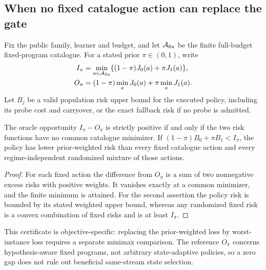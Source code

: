 \subsection{When no fixed catalogue action can replace the gate}
Fix the public family, learner and budget, and let $\mathcal A_{\rm fix}$ be the finite full-budget fixed-program catalogue.
For a stated prior $\pi\in(0,1)$, write
\begin{align}
I_\pi&=\min_{a\in\mathcal A_{\rm fix}}\{(1-\pi)J_0(a)+\pi J_1(a)\},\\
O_\pi&=(1-\pi)\min_aJ_0(a)+\pi\min_aJ_1(a).
\end{align}
Let $B_j$ be a valid population risk upper bound for the executed policy, including its probe cost and carryover, or the exact fallback risk if no probe is admitted.
\begin{proposition}
The oracle opportunity $I_\pi-O_\pi$ is strictly positive if and only if the two risk functions have no common catalogue minimizer.
If $(1-\pi)B_0+\pi B_1<I_\pi$, the policy has lower prior-weighted risk than every fixed catalogue action and every regime-independent randomized mixture of those actions.
\label{prop:research-fixed-separation}
\end{proposition}
\begin{proof}
For each fixed action the difference from $O_\pi$ is a sum of two nonnegative excess risks with positive weights.
It vanishes exactly at a common minimizer, and the finite minimum is attained.
For the second assertion the policy risk is bounded by its stated weighted upper bound, whereas any randomized fixed risk is a convex combination of fixed risks and is at least $I_\pi$.
\end{proof}
This certificate is objective-specific: replacing the prior-weighted loss by worst-instance loss requires a separate minimax comparison.
The reference $O_\pi$ concerns hypothesis-aware fixed programs, not arbitrary state-adaptive policies, so a zero gap does not rule out beneficial same-stream state selection.
